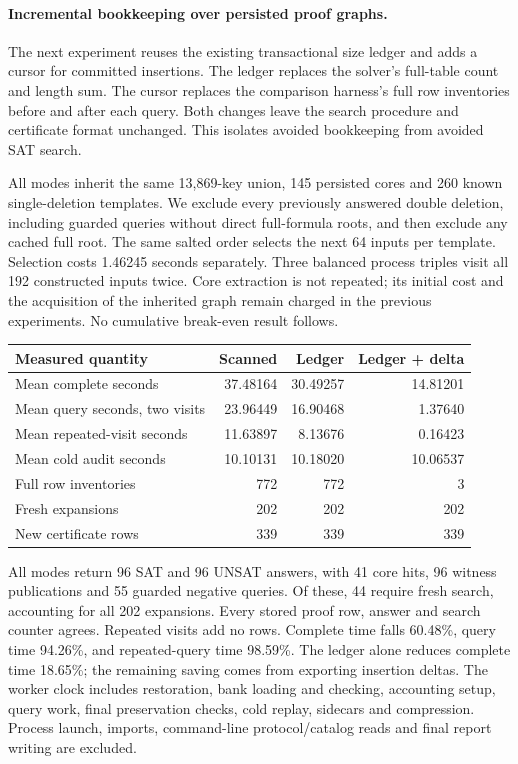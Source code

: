 \documentclass[11pt,a4paper]{article}
\numberwithin{equation}{section}
\theoremstyle{plain}
\theoremstyle{definition}
\theoremstyle{remark}
\begin{document}
\paragraph{Incremental bookkeeping over persisted proof graphs.}
The next experiment reuses the existing transactional size ledger and adds a
cursor for committed insertions. The ledger replaces the solver's full-table
count and length sum. The cursor replaces the comparison harness's full row
inventories before and after each query. Both changes leave the search procedure
and certificate format unchanged. This isolates avoided bookkeeping from
avoided SAT search.

All modes inherit the same 13,869-key union, 145 persisted cores and 260 known
single-deletion templates. We exclude every previously answered double deletion,
including guarded queries without direct full-formula roots, and then exclude
any cached full root. The same salted order selects the next 64 inputs per
template. Selection costs 1.46245 seconds separately. Three balanced process
triples visit all 192 constructed inputs twice. Core extraction is not repeated;
its initial cost and the acquisition of the inherited graph remain charged in
the previous experiments. No cumulative break-even result follows.

\begin{center}
\begin{tabular}{lrrr}
\hline
Measured quantity & Scanned & Ledger & Ledger + delta \\
\hline
Mean complete seconds & 37.48164 & 30.49257 & 14.81201 \\
Mean query seconds, two visits & 23.96449 & 16.90468 & 1.37640 \\
Mean repeated-visit seconds & 11.63897 & 8.13676 & 0.16423 \\
Mean cold audit seconds & 10.10131 & 10.18020 & 10.06537 \\
Full row inventories & 772 & 772 & 3 \\
Fresh expansions & 202 & 202 & 202 \\
New certificate rows & 339 & 339 & 339 \\
\hline
\end{tabular}
\end{center}

All modes return 96 SAT and 96 UNSAT answers, with 41 core hits, 96 witness
publications and 55 guarded negative queries. Of these, 44 require fresh search,
accounting for all 202 expansions. Every stored proof row, answer and search counter agrees.
Repeated visits add no rows. Complete time falls 60.48\%, query time 94.26\%,
and repeated-query time 98.59\%. The ledger alone reduces complete time 18.65\%;
the remaining saving comes from exporting insertion deltas. The worker clock
includes restoration, bank loading and checking, accounting setup, query work,
final preservation checks, cold replay, sidecars and compression. Process launch,
imports, command-line protocol/catalog reads and final report writing are excluded.
\end{document}
